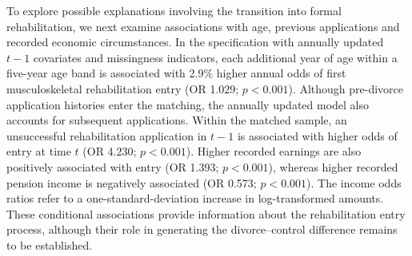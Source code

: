 \documentclass[a4paper,12pt]{article}
\theoremstyle{plain}
\theoremstyle{definition}
\theoremstyle{TheoremNum}
\theoremstyle{CorollaryNum}
\theoremstyle{PropositionNum}
\theoremstyle{TheoremNum}
\begin{document}


To explore possible explanations involving the transition into formal rehabilitation, we next examine associations with age, previous applications and recorded economic circumstances. In the specification with annually updated $t-1$ covariates and missingness indicators, each additional year of age within a five-year age band is associated with 2.9\% higher annual odds of first musculoskeletal rehabilitation entry (OR 1.029; $p<0.001$). Although pre-divorce application histories enter the matching, the annually updated model also accounts for subsequent applications. Within the matched sample, an unsuccessful rehabilitation application in $t-1$ is associated with higher odds of entry at time $t$ (OR 4.230; $p<0.001$). Higher recorded earnings are also positively associated with entry (OR 1.393; $p<0.001$), whereas higher recorded pension income is negatively associated (OR 0.573; $p<0.001$). The income odds ratios refer to a one-standard-deviation increase in log-transformed amounts. These conditional associations provide information about the rehabilitation entry process, although their role in generating the divorce–control difference remains to be established.
\end{document}
